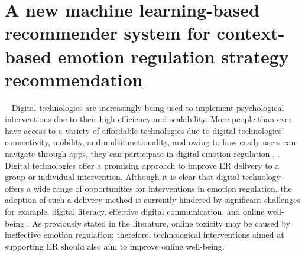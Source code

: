 \section{A new machine learning-based recommender system for context-based emotion regulation strategy recommendation}~\label{sec:evaluation}
Digital technologies are increasingly being used to implement psychological interventions due to their high efficiency and scalability. More people than ever have access to a variety of affordable technologies due to digital technologies' connectivity, mobility, and multifunctionality, and owing to how easily users can navigate through apps, they can participate in digital emotion regulation \cite{reynarddigital}, \cite{bettis2022digital}. Digital technologies offer a promising approach to improve ER delivery to a group or individual intervention. Although it is clear that digital technology offers a wide range of opportunities for interventions in emotion regulation, the adoption of such a delivery method is currently hindered by significant challenges for example, digital literacy, effective digital communication, and online well-being \cite{jadhakhan2022efficacy}. As previously stated in the literature, online toxicity may be caused by ineffective emotion regulation; therefore, technological interventions aimed at supporting ER should also aim to improve online well-being.

